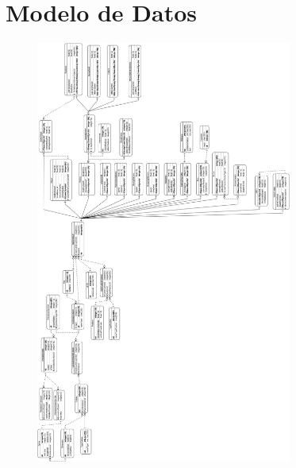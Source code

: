 \section{Modelo de Datos} \label{Anexo:ModeloDatos}

\begin{figure}[H]
    \centering
    \includegraphics[width=0.75\textwidth]{Anexos/ModeloDatos/Yolotl02.png}
\end{figure}